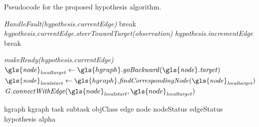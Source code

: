\begin{algorithm}[H]
  \caption{Pseudocode for the proposed hypothesis algorithm.}\label{pseudocode:halgorithm}
  \begin{algorithmic}[1]

    \hspace{-0.9cm}\colorbox{my_grey}{\parbox{\linewidth}{%

        \hspace{-0.1cm}\colorbox{my_yellow}{\parbox{\linewidth}{%

            \hspace{-0.1cm}\colorbox{my_light_blue}{\parbox{\linewidth}{%
                 
                \State \textit{HandleFault(\gls{hypothesis}.currentEdge)}
                \State break
                \EndIf
                \State \textit{\gls{hypothesis}.currentEdge.steerTowardTarget(\gls{observation})}
                  \State \textit{\gls{hypothesis}.incrementEdge}
                \Else
                  \State break
                \EndIf
                \EndIf
                \EndWhile
            }}
            \Else
            \State \textit{makeReady(\gls{hypothesis}.currentEdge)}
            \EndIf
            \Else
            \State $\mathit{\gls{node}_{localtarget}} \leftarrow \gls{hgraph}.\mathit{goBackward(\gls{node}.target)}$
            \State $\mathit{\gls{node}_{localstart}} \leftarrow \gls{hgraph}.\mathit{findCorrespondingNode(\gls{node}_{localtarget})}$ 
            \State $\mathit{G.connectWithEdge}(\gls{node}_\mathit{localstart}, \gls{node}_\mathit{localtarget})$
            \EndIf
            \EndWhile
        }}
        \EndFor
    }}
  \end{algorithmic}
\end{algorithm}

\gls{hgraph}
\gls{kgraph}
\gls{task}
\gls{subtask}
\gls{objClass}
\gls{edge}
\gls{node}
\gls{nodeStatus}
\gls{edgeStatus}
\gls{hypothesis}
\gls{alpha}




